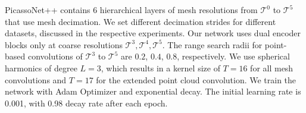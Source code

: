 \vspace{1mm}
PicassoNet++ contains 6 hierarchical layers of mesh resolutions from $\mathcal{T}^0$ to $\mathcal{T}^5$ that use mesh decimation. 
We set different decimation strides for different datasets, discussed in the respective experiments.
Our network uses dual encoder blocks only at coarse resolutions $\mathcal{T}^3,\mathcal{T}^4,\mathcal{T}^5$.
The range search radii for point-based convolutions of $\mathcal{T}^3$ to $\mathcal{T}^5$ are $0.2$, $0.4$, $0.8$, respectively. {\color{black}We use spherical harmonics of degree $L{=}3$, which results in a kernel size of $T{=}16$ for all mesh convolutions and $T{=}17$ for the extended point cloud convolution. 
We train the network with Adam Optimizer \cite{kingma2015adam} and exponential decay. The initial learning rate is 0.001, with 0.98 decay rate after each epoch.} 


